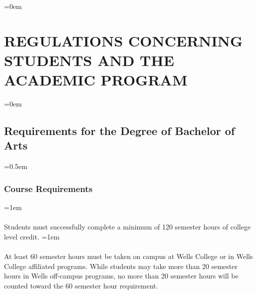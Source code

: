 \documentclass{manual}
\newcommand{\modified}[1]{}
\let\stdsection\section %
\renewcommand\section{\newpage\stdsection}
\let\oldsection\section
\renewcommand\section{\leftskip=0em\oldsection}
\let\oldsubsection\subsection
\renewcommand\subsection{\leftskip=0em\oldsubsection}
\let\oldsubsubsection\subsubsection
\renewcommand\subsubsection{\leftskip=0.5em\oldsubsubsection}
\let\oldparagraph\paragraph
\renewcommand\paragraph{\leftskip=1em\oldparagraph}
\begin{document}






















































\section{REGULATIONS CONCERNING STUDENTS AND THE ACADEMIC PROGRAM}\label{art:RegulationsConcerningStudentStatus}

\subsection{Requirements for the Degree of Bachelor of Arts}

\subsubsection{Course Requirements}

\paragraph{} Students must successfully complete a minimum of 120 semester\modified{5/13/93} hours of college level credit.
\paragraph{} At least 60 semester hours must be taken on campus at Wells College\modified{5/13/93} or in Wells College affiliated programs. While students may take more than 20 semester hours in Wells off-campus programs, no more than 20 semester hours will be counted toward the 60 semester hour requirement.
\end{document}
